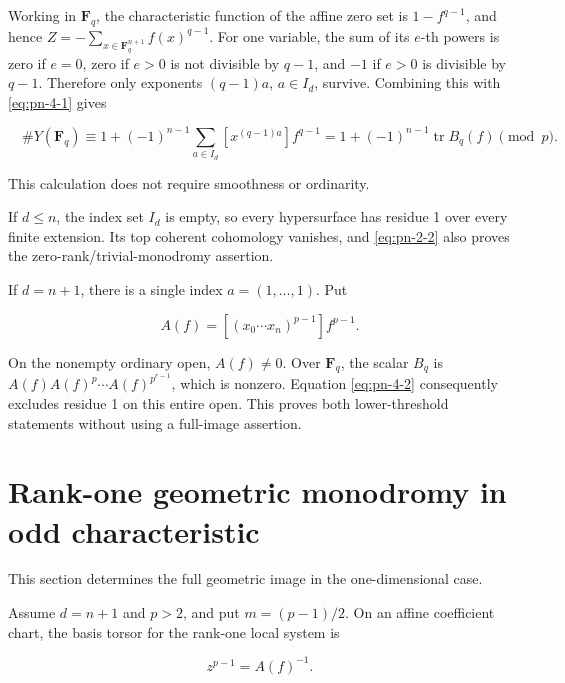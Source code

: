 \documentclass[11pt]{article}
\begin{document}
Working in \(\mathbf F_q\), the characteristic function of the affine
zero set is \(1-f^{q-1}\), and hence
\(Z=-\sum_{x\in\mathbf F_q^{n+1}}f(x)^{q-1}\).
For one variable, the sum of its \(e\)-th powers is zero if \(e=0\),
zero if \(e>0\) is not divisible by \(q-1\), and \(-1\) if \(e>0\)
is divisible by \(q-1\). Therefore only exponents
\((q-1)a\), \(a\in I_d\), survive. Combining this with \eqref{eq:pn-4-1} gives

\begin{equation}
 \boxed{\quad
 \#Y(\mathbf F_q)\equiv
 1+(-1)^{n-1}\sum_{a\in I_d}[x^{(q-1)a}]f^{q-1}
 =1+(-1)^{n-1}\operatorname{tr}B_q(f)\pmod p.
 \quad}                                                               \label{eq:pn-4-2}
\end{equation}

This calculation does not require smoothness or ordinarity.

If \(d\leq n\), the index set \(I_d\) is empty, so every hypersurface
has residue 1 over every finite extension. Its top coherent cohomology
vanishes, and \eqref{eq:pn-2-2} also proves the zero-rank/trivial-monodromy assertion.

If \(d=n+1\), there is a single index \(a=(1,\ldots,1)\). Put

\begin{equation}
 A(f)=[(x_0\cdots x_n)^{p-1}]f^{p-1}.
\end{equation}

On the nonempty ordinary open, \(A(f)\neq0\). Over \(\mathbf F_q\),
the scalar \(B_q\) is
\(A(f)A(f)^p\cdots A(f)^{p^{r-1}}\), which is nonzero.
Equation \eqref{eq:pn-4-2} consequently excludes residue 1 on this entire open.
This proves both lower-threshold statements without using a full-image assertion.

\section{Rank-one geometric monodromy in odd characteristic}\label{sec:pn-5}

This section determines the full geometric image in the one-dimensional case.

Assume \(d=n+1\) and \(p>2\), and put \(m=(p-1)/2\). On an affine
coefficient chart, the basis torsor for the rank-one local system is

\begin{equation}
                   z^{p-1}=A(f)^{-1}.                                 \label{eq:pn-5-1}
\end{equation}
\end{document}
